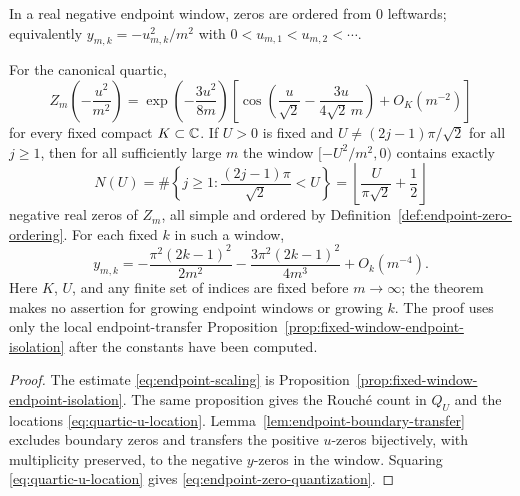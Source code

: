 \begin{definition}\label{def:endpoint-zero-ordering}
In a real negative endpoint window, zeros are ordered from $0$ leftwards; equivalently $y_{m,k}=-u_{m,k}^2/m^2$ with $0<u_{m,1}<u_{m,2}<\cdots$.
\end{definition}

\begin{theorem}\label{thm:endpoint-zero-quantization}
For the canonical quartic,
\begin{equation}\label{eq:endpoint-scaling}
Z_m\!\left(-\frac{u^2}{m^2}\right)=
\exp\!\left(-\frac{3u^2}{8m}\right)
\left[
\cos\!\left(\frac{u}{\sqrt2}-\frac{3u}{4\sqrt2\,m}\right)+O_K(m^{-2})
\right]
\end{equation}
for every fixed compact $K\subset\mathbb{C}$.  If $U>0$ is fixed and $U\ne(2j-1)\pi/\sqrt2$ for all $j\ge1$, then for all sufficiently large $m$ the window $[-U^2/m^2,0)$ contains exactly
\[
N(U)=\#\left\{j\ge1:\frac{(2j-1)\pi}{\sqrt2}<U\right\}
=\left\lfloor\frac{U}{\pi\sqrt2}+\frac12\right\rfloor
\]
negative real zeros of $Z_m$, all simple and ordered by Definition~\ref{def:endpoint-zero-ordering}.  For each fixed $k$ in such a window,
\begin{equation}\label{eq:endpoint-zero-quantization}
y_{m,k}= -\frac{\pi^{2}(2k-1)^2}{2m^2}-\frac{3\pi^{2}(2k-1)^2}{4m^3}+O_k(m^{-4}).
\end{equation}
Here $K$, $U$, and any finite set of indices are fixed before $m\to\infty$; the theorem makes no assertion for growing endpoint windows or growing $k$.  The proof uses only the local endpoint-transfer Proposition~\ref{prop:fixed-window-endpoint-isolation} after the constants have been computed.
\end{theorem}
\begin{proof}
The estimate \eqref{eq:endpoint-scaling} is Proposition~\ref{prop:fixed-window-endpoint-isolation}.  The same proposition gives the Rouch\'e count in $Q_U$ and the locations \eqref{eq:quartic-u-location}.  Lemma~\ref{lem:endpoint-boundary-transfer} excludes boundary zeros and transfers the positive $u$-zeros bijectively, with multiplicity preserved, to the negative $y$-zeros in the window.  Squaring \eqref{eq:quartic-u-location} gives \eqref{eq:endpoint-zero-quantization}.
\end{proof}
